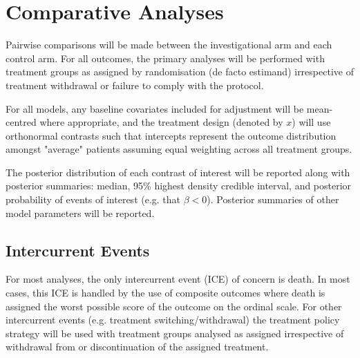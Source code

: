\documentclass[11pt,parskip=half-]{scrartcl}
\begin{document}
\clearpage

\section{Comparative Analyses}

Pairwise comparisons will be made between the investigational arm and each control arm. For all outcomes, the primary analyses will be performed with treatment groups as assigned by randomisation (de facto estimand) irrespective of treatment withdrawal or failure to comply with the protocol.

For all models, any baseline covariates included for adjustment will be mean-centred where appropriate, and the treatment design (denoted by $x$) will use orthonormal contrasts such that intercepts represent the outcome distribution amongst "average" patients assuming equal weighting across all treatment groups.

The posterior distribution of each contrast of interest will be reported along with posterior summaries: median, 95\% highest density credible interval, and posterior probability of events of interest (e.g. that $\beta < 0$). Posterior summaries of other model parameters will be reported.


\subsection{Intercurrent Events}

For most analyses, the only intercurrent event (ICE) of concern is death. In most cases, this ICE is handled by the use of composite outcomes where death is assigned the worst possible score of the outcome on the ordinal scale. For other intercurrent events (e.g. treatment switching/withdrawal) the treatment policy strategy will be used with treatment groups analysed as assigned irrespective of withdrawal from or discontinuation of the assigned treatment.
\end{document}
